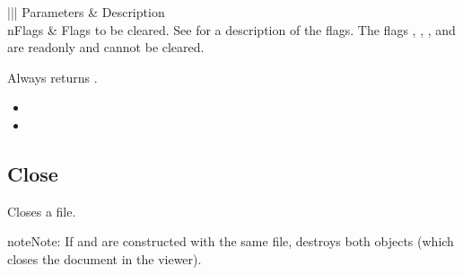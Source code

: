 \documentclass[letterpaper,12pt,english,openany,oneside]{sphinxmanual}
\begin{document}
\begin{savenotes}\sphinxattablestart
\centering
{}\label{\detokenize{IAC_API_OLE_Objects:section-58}}\nobreak
\begin{tabular}[t]{|||}
\hline
\sphinxstyletheadfamily 
Parameters
&\sphinxstyletheadfamily 
Description
\\
\hline
nFlags
&
Flags to be cleared. See   for a description of the flags. The flags  ,  ,  , and  are read\sphinxhyphen{}only and cannot be cleared.
\\
\hline
\end{tabular}
\par
\sphinxattableend\end{savenotes}


Always returns .

\label{\detokenize{IAC_API_OLE_Objects:related-methods-89}}
\begin{itemize}
\item {} 
 

\item {} 
 

\end{itemize}




\subsection{Close}
\label{\detokenize{IAC_API_OLE_Objects:close-1}}\label{\detokenize{IAC_API_OLE_Objects:id17}}
Closes a file.

\begin{sphinxadmonition}{note}{Note:}
If  and  are constructed with the same file,  destroys both objects (which closes the document in the viewer).
\end{sphinxadmonition}
\end{document}
